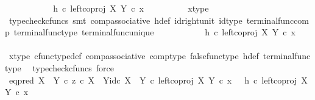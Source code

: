 \begin{isabellebody}
\ \ \ \ \ \ \isamarkupfalse%
\ \isamarkupfalse%
\ {\isachardoublequoteopen}{\isachardot}{\kern0pt}{\isachardot}{\kern0pt}{\isachardot}{\kern0pt}\ {\isacharequal}{\kern0pt}\ h\ {\isasymcirc}\isactrlsub c\ {\isacharparenleft}{\kern0pt}left{\isacharunderscore}{\kern0pt}coproj\ X\ Y\ {\isasymcirc}\isactrlsub c\ x{\isacharparenright}{\kern0pt}{\isachardoublequoteclose}\isanewline
\ \ \ \ \ \ \ \ \isamarkupfalse%
\ x{\isacharunderscore}{\kern0pt}type\ \isamarkupfalse%
\ {\isacharparenleft}{\kern0pt}typecheck{\isacharunderscore}{\kern0pt}cfuncs{\isacharcomma}{\kern0pt}\ smt\ comp{\isacharunderscore}{\kern0pt}associative{}\ h{\isacharunderscore}{\kern0pt}def\ id{\isacharunderscore}{\kern0pt}right{\isacharunderscore}{\kern0pt}unit{}\ id{\isacharunderscore}{\kern0pt}type\ terminal{\isacharunderscore}{\kern0pt}func{\isacharunderscore}{\kern0pt}comp\ terminal{\isacharunderscore}{\kern0pt}func{\isacharunderscore}{\kern0pt}type\ terminal{\isacharunderscore}{\kern0pt}func{\isacharunderscore}{\kern0pt}unique{\isacharparenright}{\kern0pt}\isanewline
\ \ \ \ \ \ \isamarkupfalse%
\ \isamarkupfalse%
\ {\isachardoublequoteopen}{\isachardot}{\kern0pt}{\isachardot}{\kern0pt}{\isachardot}{\kern0pt}\ {\isacharequal}{\kern0pt}\ {\isacharparenleft}{\kern0pt}h\ {\isasymcirc}\isactrlsub c\ left{\isacharunderscore}{\kern0pt}coproj\ X\ Y{\isacharparenright}{\kern0pt}\ {\isasymcirc}\isactrlsub c\ x{\isachardoublequoteclose}\isanewline
\ \ \ \ \ \ \ \ \ \ \ \ \ \isamarkupfalse%
\ x{\isacharunderscore}{\kern0pt}type\ cfunc{\isacharunderscore}{\kern0pt}type{\isacharunderscore}{\kern0pt}def\ comp{\isacharunderscore}{\kern0pt}associative\ comp{\isacharunderscore}{\kern0pt}type\ false{\isacharunderscore}{\kern0pt}func{\isacharunderscore}{\kern0pt}type\ h{\isacharunderscore}{\kern0pt}def\ terminal{\isacharunderscore}{\kern0pt}func{\isacharunderscore}{\kern0pt}type\ \isamarkupfalse%
\ {\isacharparenleft}{\kern0pt}typecheck{\isacharunderscore}{\kern0pt}cfuncs{\isacharcomma}{\kern0pt}\ force{\isacharparenright}{\kern0pt}\isanewline
\ \ \ \ \ \ \isamarkupfalse%
\ \isamarkupfalse%
\ {\isachardoublequoteopen}{\isacharparenleft}{\kern0pt}{\isacharparenleft}{\kern0pt}eq{\isacharunderscore}{\kern0pt}pred\ {\isacharparenleft}{\kern0pt}X\ {\isasymCoprod}\ Y{\isacharparenright}{\kern0pt}\ {\isasymcirc}\isactrlsub c\ {\isasymlangle}z\ {\isasymcirc}\isactrlsub c\ {\isasymbeta}\isactrlbsub X\ {\isasymCoprod}\ Y\isactrlesub {\isacharcomma}{\kern0pt}id\isactrlsub c\ {\isacharparenleft}{\kern0pt}X\ {\isasymCoprod}\ Y{\isacharparenright}{\kern0pt}{\isasymrangle}{\isacharparenright}{\kern0pt}\ {\isasymcirc}\isactrlsub c\ left{\isacharunderscore}{\kern0pt}coproj\ X\ Y{\isacharparenright}{\kern0pt}\ {\isasymcirc}\isactrlsub c\ x\ \ {\isacharequal}{\kern0pt}\ {\isacharparenleft}{\kern0pt}h\ {\isasymcirc}\isactrlsub c\ left{\isacharunderscore}{\kern0pt}coproj\ X\ Y{\isacharparenright}{\kern0pt}\ {\isasymcirc}\isactrlsub c\ x{\isachardoublequoteclose}\isacommand{{\isachardot}{\kern0pt}}\isamarkupfalse%

\end{isabellebody}
